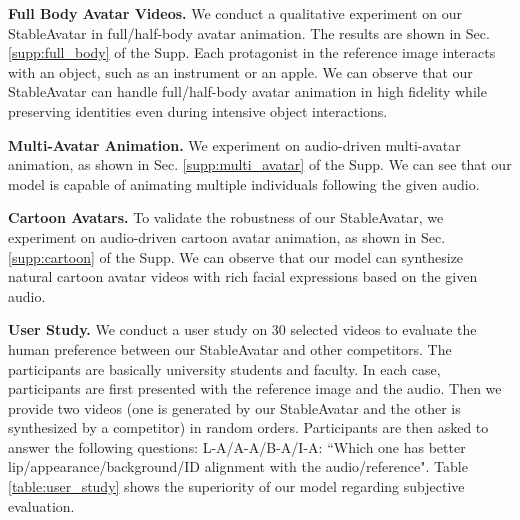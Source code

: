 \noindent\textbf{Full Body Avatar Videos.}
We conduct a qualitative experiment on our StableAvatar in full/half-body avatar animation.
The results are shown in Sec. \ref{supp:full_body} of the Supp. 
Each protagonist in the reference image interacts with an object, such as an instrument or an apple.
We can observe that our StableAvatar can handle full/half-body avatar animation in high fidelity while preserving identities even during intensive object interactions.

\noindent\textbf{Multi-Avatar Animation.}
We experiment on audio-driven multi-avatar animation, as shown in Sec. \ref{supp:multi_avatar} of the Supp. We can see that our model is capable of animating multiple individuals following the given audio. 

\noindent\textbf{Cartoon Avatars.}
To validate the robustness of our StableAvatar, we experiment on audio-driven cartoon avatar animation, as shown in Sec. \ref{supp:cartoon} of the Supp. We can observe that our model can synthesize natural cartoon avatar videos with rich facial expressions based on the given audio.

\noindent\textbf{User Study.}
We conduct a user study on 30 selected videos to evaluate the human preference between our StableAvatar and other competitors. The participants are basically university students and faculty. In each case, participants are first presented with the reference image and the audio. Then we provide two videos (one is generated by our StableAvatar and the other is synthesized by a competitor) in random orders. Participants are then asked to answer the following questions: 
L-A/A-A/B-A/I-A: ``Which one has better lip/appearance/background/ID alignment with the audio/reference". Table \ref{table:user_study} shows the superiority of our model regarding subjective evaluation.

\begin{table}[t!]\small
\caption{User preference of StableAvatar compared with other competitors. Higher indicates users prefer more to our model.
}
\vspace{-0.25in}
\begin{center}
\renewcommand\arraystretch{1.1}
\end{center}
\label{table:user_study}
\vspace{-0.3in}
\end{table}